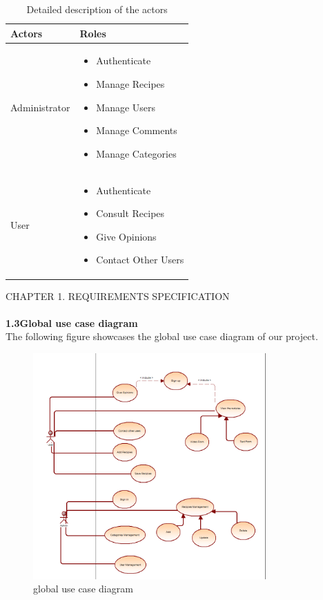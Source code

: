\documentclass{article}
\begin{document}
\begin{table}[h]
    \centering
    \begin{tabularx}{\textwidth}{X|X}
        \toprule
        \textbf{\color{blue!70} Actors} & \textbf{\color{blue!70} Roles} \\ 
        \midrule
        Administrator &  \begin{itemize}[label=$\bullet$]
	\item Authenticate
	\item Manage Recipes	
	\item Manage Users
	\item Manage Comments 
	\item Manage Categories
\end{itemize} \\
        \midrule
        User & \begin{itemize}[label=$\bullet$]
	\item Authenticate
	\item Consult Recipes
	\item Give Opinions
	\item Contact Other Users
\end{itemize}\\
        \bottomrule
    \end{tabularx}
    \caption{Detailed description of the actors}
    \label{tab:actors_roles}
\end{table}
\newpage
\noindent
CHAPTER 1.  REQUIREMENTS SPECIFICATION \\
\underline{\hspace{\textwidth}} \vspace{0.2cm}\\
{\Large \textbf{1.3\hspace{1em}Global use case diagram}}\vspace{0.2cm}
\\The following figure showcases the global use case diagram of our project.\vspace{0.2cm}
\begin{figure}[h]
    \centering
    \includegraphics[width=0.8\textwidth,height=0.9\textheight,keepaspectratio]{use case dia}
    \caption{global use case diagram}
    \label{fig:example}
\end{figure}
\end{document}
